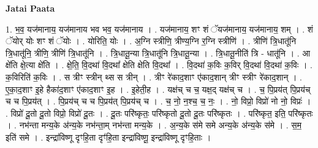 \documentclass[17pt]{extarticle}
\begin{document}
\textbf{Jatai Paata} \newline

1. भ॒व॒ यज॑मानाय॒ यज॑मानाय भव भव॒ यज॑मानाय । . यज॑मानाय॒ शꣳ शं ॅयज॑मानाय॒ यज॑मानाय॒ शम् । . शं ॅयोर् योः शꣳ शं ॅयोः । . योरिति॒ योः । . अ॒ग्नि स्त्रीणि॒ त्रीण्य॒ग्नि र॒ग्नि स्त्रीणि॑ । . त्रीणि॑ त्रि॒धातू॑नि त्रि॒धातू॑नि॒ त्रीणि॒ त्रीणि॑ त्रि॒धातू॑नि । . त्रि॒धातू॒न्या त्रि॒धातू॑नि त्रि॒धातू॒न्या । . त्रि॒धातू॒नीति॑ त्रि - धातू॑नि । . आ क्षे॑ति क्षे॒त्या क्षे॑ति । . क्षे॒ति॒ वि॒दथा॑ वि॒दथा᳚ क्षेति क्षेति वि॒दथा᳚ । . वि॒दथा॑ क॒विः क॒विर् वि॒दथा॑ वि॒दथा॑ क॒विः । . क॒विरिति॑ क॒विः । . स त्रीꣳ स्त्रीन् थ्स स त्रीन् । . त्रीꣳ रे॑काद॒शाꣳ ए॑काद॒शान् त्रीꣳ स्त्रीꣳ रे॑काद॒शान् । . ए॒का॒द॒शाꣳ इ॒हे हैका॑द॒शाꣳ ए॑काद॒शाꣳ इ॒ह । . इ॒हेती॒ह । . यक्ष॑च् च च॒ यक्ष॒द् यक्ष॑च् च । . च॒ पि॒प्रय॑त् पि॒प्रय॑च् च च पि॒प्रय॑त् । . पि॒प्रय॑च् च च पि॒प्रय॑त् पि॒प्रय॑च् च । . च॒ नो॒ न॒श्च॒ च॒ नः॒ । . नो॒ विप्रो॒ विप्रो॑ नो नो॒ विप्रः॑ । . विप्रो॑ दू॒तो दू॒तो विप्रो॒ विप्रो॑ दू॒तः । . दू॒तः परि॑ष्कृतः॒ परि॑ष्कृतो दू॒तो दू॒तः परि॑ष्कृतः । . परि॑ष्कृत॒ इति॒ परि॑ष्कृतः । . नभ॑न्ता मन्य॒के अ॑न्य॒के नभ॑न्ता॒म् नभ॑न्ता मन्य॒के । . अ॒न्य॒के स॑मे समे अन्य॒के अ॑न्य॒के स॑मे । . स॒म॒ इति॑ समे । . इन्द्रा॑विष्णू दृꣳहि॒ता दृꣳ॑हि॒ता इन्द्रा॑विष्णू॒ इन्द्रा॑विष्णू दृꣳहि॒ताः । \newline
\end{document}
